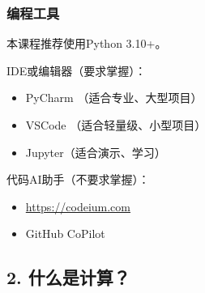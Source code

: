 \documentclass[aspectratio=169, 14pt]{beamer}
\begin{document}
\begin{frame}
	\frametitle{编程工具}
	本课程推荐使用\alert{Python 3.10+}。

	IDE或编辑器（要求掌握）：
	\begin{itemize}
		\item PyCharm （适合专业、大型项目）
		\item VSCode （适合轻量级、小型项目）
		\item Jupyter（适合演示、学习）
	\end{itemize}

	代码AI助手（不要求掌握）：
	\begin{itemize}
		\item \url{https://codeium.com}
		\item GitHub CoPilot
	\end{itemize}
\end{frame}

{
\begin{frame}
	\section{\textcolor{darkmidnightblue}{2. 什么是计算？}}
\end{frame}
}
\end{document}
